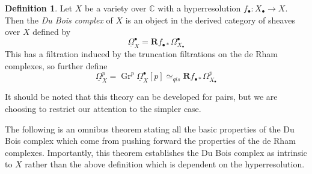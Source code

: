 \documentclass[proquest]{uwthesis}[2014/11/13]
\theoremstyle{definition}
\newtheorem{definition}[theorem]{Definition}
\DeclareMathOperator{\Gr}{Gr}
\newcommand{\CC}{\mathbb{C}}
\newcommand{\qis}{\simeq_{qis}}
\newcommand{\bR}{\textbf{R}}
\newcommand{\DB}{\underline{\Omega}}
\begin{document}
\begin{definition}
	Let $X$ be a variety over $\CC$ with a hyperresolution $f_\bullet : X_\bullet \rightarrow X$.
	Then the {\it Du Bois complex} of $X$ is an object in the derived category of sheaves over $X$ defined by
	\[
	\DB_X^\bullet = \bR f_{\bullet *} \Omega_{X_\bullet}^\bullet
	\]
	This has a filtration induced by the truncation filtrations on the de Rham complexes, so further define
	\[
	\DB_X^p = \Gr^p \DB_X^\bullet [p] \qis \bR f_{\bullet *} \Omega_{X_\bullet}^p
	\]
\end{definition}

It should be noted that this theory can be developed for pairs, but we are choosing to restrict our attention to the simpler case.

The following is an omnibus theorem stating all the basic properties of the Du Bois complex which come from pushing forward the properties of the de Rham complexes.
Importantly, this theorem establishes the Du Bois complex as intrinsic to $X$ rather than the above definition which is dependent on the hyperresolution.
\end{document}
